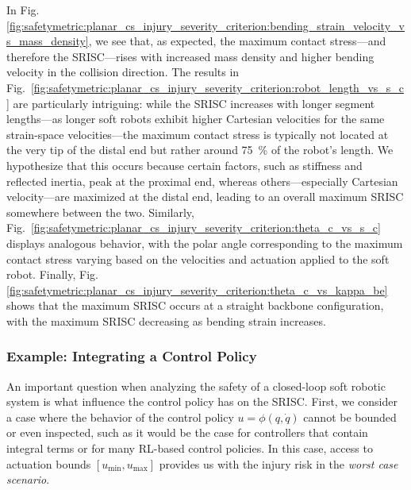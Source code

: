 In Fig.\ref{fig:safetymetric:planar_cs_injury_severity_criterion:bending_strain_velocity_vs_mass_density}, we see that, as expected, the maximum contact stress—and therefore the \gls{SRISC}—rises with increased mass density and higher bending velocity in the collision direction. The results in Fig.~\ref{fig:safetymetric:planar_cs_injury_severity_criterion:robot_length_vs_s_c} are particularly intriguing: while the \gls{SRISC} increases with longer segment lengths—as longer soft robots exhibit higher Cartesian velocities for the same strain-space velocities—the maximum contact stress is typically not located at the very tip of the distal end but rather around \SI{75}{\percent} of the robot’s length. We hypothesize that this occurs because certain factors, such as stiffness and reflected inertia, peak at the proximal end, whereas others—especially Cartesian velocity—are maximized at the distal end, leading to an overall maximum \gls{SRISC} somewhere between the two. Similarly, Fig.~\ref{fig:safetymetric:planar_cs_injury_severity_criterion:theta_c_vs_s_c} displays analogous behavior, with the polar angle corresponding to the maximum contact stress varying based on the velocities and actuation applied to the soft robot. Finally, Fig.\ref{fig:safetymetric:planar_cs_injury_severity_criterion:theta_c_vs_kappa_be} shows that the maximum \gls{SRISC} occurs at a straight backbone configuration, with the maximum \gls{SRISC} decreasing as bending strain increases.

\subsubsection{Example: Integrating a Control Policy}
An important question when analyzing the safety of a closed-loop soft robotic system is what influence the control policy has on the \gls{SRISC}.
First, we consider a case where the behavior of the control policy $u = \phi(q,\dot{q})$ cannot be bounded or even inspected, such as it would be the case for controllers that contain integral terms or for many RL-based control policies.
In this case, access to actuation bounds $[u_\mathrm{min}, u_\mathrm{max}]$ provides us with the injury risk in the \emph{worst case scenario}.


